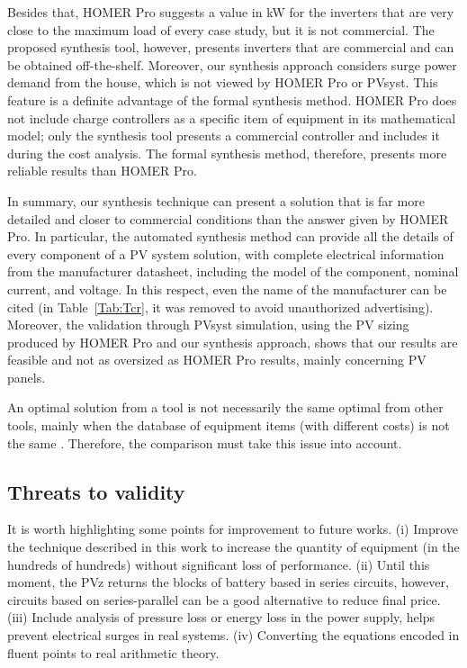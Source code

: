 \documentclass[10pt,journal,compsoc]{IEEEtran}
\begin{document}
Besides that, HOMER Pro suggests a value in kW for the inverters that are very close to the maximum load of every case study, but it is not commercial. The proposed synthesis tool, however, presents inverters that are commercial and can be obtained off-the-shelf. Moreover, our synthesis approach considers surge power demand from the house, which is not viewed by HOMER Pro or PVsyst. This feature is a definite advantage of the formal synthesis method. HOMER Pro does not include charge controllers as a specific item of equipment in its mathematical model; only the synthesis tool presents a commercial controller and includes it during the cost analysis. The formal synthesis method, therefore, presents more reliable results than HOMER Pro.

In summary, our synthesis technique can present a solution that is far more detailed and closer to commercial conditions than the answer given by HOMER Pro. In particular, the automated synthesis method can provide all the details of every component of a PV system solution, with complete electrical information from the manufacturer datasheet, including the model of the component, nominal current, and voltage. In this respect, even the name of the manufacturer can be cited (in Table~\ref{Tab:Tcr}, it was removed to avoid unauthorized advertising). Moreover, the validation through PVsyst simulation, using the PV sizing produced by HOMER Pro and our synthesis approach, shows that our results are feasible and not as oversized as HOMER Pro results, mainly concerning PV panels.

An optimal solution from a tool is not necessarily the same optimal from other tools, mainly when the database of equipment items (with different costs) is not the same \cite{Alsadi2018}. Therefore, the comparison must take this issue into account. 

\subsection{Threats to validity} 

  It is worth highlighting some points for improvement to future works. (i) Improve the technique described in this work to increase the quantity of equipment (in the hundreds of hundreds) without significant loss of performance. (ii) Until this moment, the PVz returns the blocks of battery based in series circuits, however, circuits based on series-parallel can be a good alternative to reduce final price. (iii) Include analysis of pressure loss or energy loss in the power supply, helps prevent electrical surges in real systems. (iv) Converting the equations encoded in fluent points to real arithmetic theory.
\end{document}
